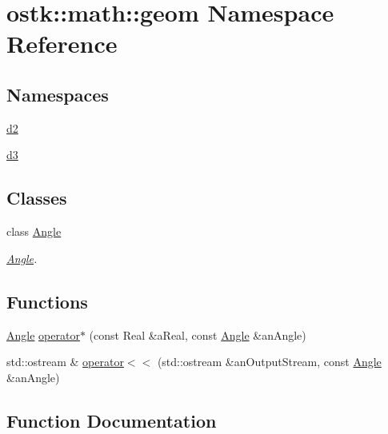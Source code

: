 \hypertarget{namespaceostk_1_1math_1_1geom}{}\section{ostk\+:\+:math\+:\+:geom Namespace Reference}
\label{namespaceostk_1_1math_1_1geom}
\subsection*{Namespaces}
\begin{DoxyCompactItemize}
\item 
 \hyperlink{namespaceostk_1_1math_1_1geom_1_1d2}{d2}
\item 
 \hyperlink{namespaceostk_1_1math_1_1geom_1_1d3}{d3}
\end{DoxyCompactItemize}
\subsection*{Classes}
\begin{DoxyCompactItemize}
\item 
class \hyperlink{classostk_1_1math_1_1geom_1_1_angle}{Angle}
\begin{DoxyCompactList}\small\item\em \hyperlink{classostk_1_1math_1_1geom_1_1_angle}{Angle}. \end{DoxyCompactList}\end{DoxyCompactItemize}
\subsection*{Functions}
\begin{DoxyCompactItemize}
\item 
\hyperlink{classostk_1_1math_1_1geom_1_1_angle}{Angle} \hyperlink{namespaceostk_1_1math_1_1geom_a2e336aa45626f76d19a27ea65fbb6fc7}{operator$\ast$} (const Real \&a\+Real, const \hyperlink{classostk_1_1math_1_1geom_1_1_angle}{Angle} \&an\+Angle)
\item 
std\+::ostream \& \hyperlink{namespaceostk_1_1math_1_1geom_a060d2a5d248f324357820979408deba5}{operator$<$$<$} (std\+::ostream \&an\+Output\+Stream, const \hyperlink{classostk_1_1math_1_1geom_1_1_angle}{Angle} \&an\+Angle)
\end{DoxyCompactItemize}


\subsection{Function Documentation}
\mbox{\label{namespaceostk_1_1math_1_1geom_a2e336aa45626f76d19a27ea65fbb6fc7}} 
